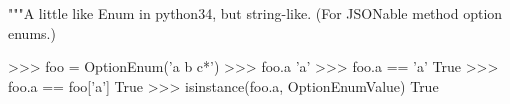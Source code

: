\begin{python}
    """A little like Enum in python34, but string-like.                                                                                                                                                                           
    (For JSONable method option enums.)                                                                                                                                                                                           
                                                                                                                                                                                                                                  
    >>> foo = OptionEnum('a b c*')                                                                                                                                                                                                
    >>> foo.a                                                                                                                                                                                                                     
    'a'                                                                                                                                                                                                                           
    >>> foo.a == 'a'                                                                                                                                                                                                              
    True                                                                                                                                                                                                                          
    >>> foo.a == foo['a']                                                                                                                                                                                                         
    True                                                                                                                                                                                                                          
    >>> isinstance(foo.a, OptionEnumValue)                                                                                                                                                                                        
    True                                                                                                                                                                                                                          

\end{python}

